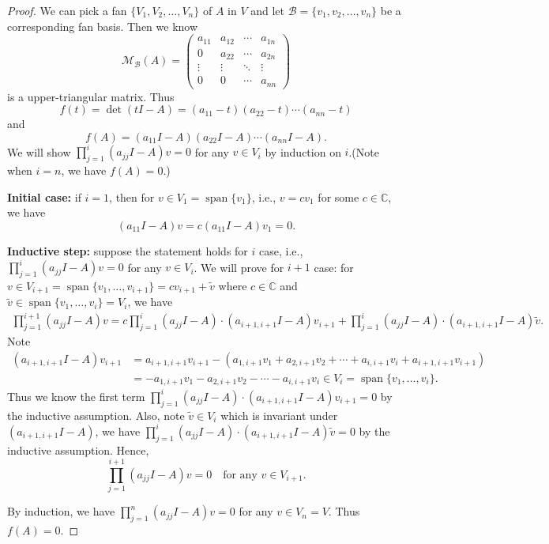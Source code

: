 \documentclass{ctexart}
\newcommand{\C}{\mathbb{C}}
\begin{document}
    \begin{proof}
        We can pick a fan $\{ V_1, V_2, \ldots, V_n \}$ of $A$ in $V$ and let $\mathcal B = \{ v_1, v_2, \ldots, v_n \}$ be a corresponding fan basis. Then we know
        $$ \mathcal M_\mathcal{B}(A) = \begin{pmatrix}
            a_{11} & a_{12} & \cdots & a_{1n} \\
            0 & a_{22} & \cdots & a_{2n} \\
            \vdots & \vdots & \ddots & \vdots \\
            0 & 0 & \cdots & a_{nn}
        \end{pmatrix}$$
        is a upper-triangular matrix. Thus 
        $$ f(t) = \det (tI - A) = (a_{11} - t)(a_{22} - t) \cdots (a_{nn} - t) $$
        and
        $$ f(A) = (a_{11} I - A)(a_{22} I - A) \cdots (a_{nn} I - A). $$
        We will show $\displaystyle \prod_{j=1}^{i}(a_{jj} I - A) v = 0$ for any $v \in V_i$ by induction on $i$.(Note when $i=n$, we have $f(A) =0$.)

        \textbf{Initial case:} if $i=1$, then for $v \in V_1 = \operatorname{span} \{ v_1 \}$, i.e., $v = c v_1$ for some $c\in \C$, we have
        $$ (a_{11} I - A) v = c(a_{11} I - A) v_1 = 0. $$


        \textbf{Inductive step:} suppose the statement holds for $i$ case, i.e.,
        $\displaystyle \prod_{j=1}^i (a_{jj} I - A) v = 0$ for any $v \in V_i$. We will prove for $i+1$ case: for $v \in V_{i+1} = \operatorname{span} \{ v_1, \ldots, v_{i+1} \} = cv_{i+1} + \tilde{v}$ where $c\in \C$ and $\tilde{v} \in \operatorname{span} \{ v_1, \ldots, v_i \} = V_i$, we have
        \begin{align*}
            \prod_{j=1}^{i+1} (a_{jj} I - A) v = c\prod_{j=1}^{i} (a_{jj} I - A) \cdot (a_{i+1,i+1} I - A) v_{i+1} + \prod_{j=1}^i (a_{jj} I - A) \cdot (a_{i+1,i+1} I - A) \tilde{v}.
        \end{align*}
        Note
        $$\begin{aligned}
            (a_{i+1,i+1} I - A) v_{i+1} &= a_{i+1,i+1} v_{i+1} - (a_{1,i+1} v_1 + a_{2,i+1} v_2 + \cdots + a_{i,i+1} v_i + a_{i+1,i+1} v_{i+1})\\ &= -a_{1,i+1} v_1 - a_{2,i+1} v_2 - \cdots - a_{i,i+1} v_i \in V_i = \operatorname{span}\{ v_1, \ldots, v_i \}.
        \end{aligned}$$
        Thus we know the first term $\displaystyle \prod_{j=1}^i (a_{jj} I - A) \cdot (a_{i+1,i+1} I - A) v_{i+1} = 0$ by the inductive assumption. Also, note $\displaystyle \tilde{v} \in V_i$ which is invariant under $(a_{i+1,i+1} I - A)$, we have $\displaystyle \prod_{j=1}^i (a_{jj} I - A) \cdot (a_{i+1,i+1} I - A) \tilde{v} = 0$ by the inductive assumption. Hence,
        $$\prod_{j=1}^{i+1} (a_{jj} I - A) v = 0 \quad \text{for any } v \in V_{i+1}. $$

        By induction, we have $\displaystyle \prod_{j=1}^n (a_{jj} I - A) v = 0$ for any $v \in V_n = V$. Thus $f(A) = 0$.
    \end{proof}
\end{document}
